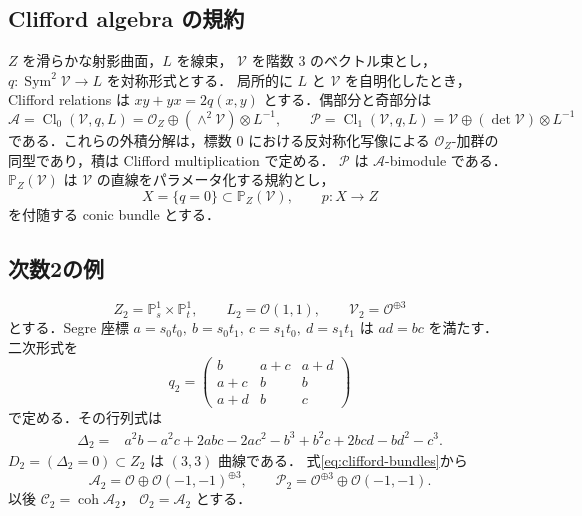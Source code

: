 \subsection{Clifford algebra の規約}

$Z$ を滑らかな射影曲面，$L$ を線束，
$\mathcal V$ を階数 $3$ のベクトル束とし，
$q:\operatorname{Sym}^2\mathcal V\to L$ を対称形式とする．
局所的に $L$ と $\mathcal V$ を自明化したとき，Clifford relations は
$xy+yx=2q(x,y)$ とする．偶部分と奇部分は
\begin{equation}
 \mathcal A=\operatorname{Cl}_0(\mathcal V,q,L)
 =\mathcal O_Z\oplus(\wedge^2\mathcal V)\otimes L^{-1},
 \qquad
 \mathcal P=\operatorname{Cl}_1(\mathcal V,q,L)
 =\mathcal V\oplus(\det\mathcal V)\otimes L^{-1}
 \label{eq:clifford-bundles}
\end{equation}
である．これらの外積分解は，標数 $0$ における反対称化写像による
$\mathcal O_Z$-加群の同型であり，積は Clifford multiplication で定める．
$\mathcal P$ は $\mathcal A$-bimodule である．
$\mathbb P_Z(\mathcal V)$ は $\mathcal V$ の直線をパラメータ化する規約とし，
\[
 X=\{q=0\}\subset\mathbb P_Z(\mathcal V),\qquad p:X\to Z
\]
を付随する conic bundle とする．

\subsection{次数2の例}
\label{subsec:example2}

\[
 Z_2=\mathbb P^1_s\times\mathbb P^1_t,\qquad
 L_2=\mathcal O(1,1),\qquad \mathcal V_2=\mathcal O^{\oplus3}
\]
とする．Segre 座標
$a=s_0t_0,\ b=s_0t_1,\ c=s_1t_0,\ d=s_1t_1$ は $ad=bc$ を満たす．
二次形式を
\begin{equation}
 q_2=
 \begin{pmatrix}
 b&a+c&a+d\\
 a+c&b&b\\
 a+d&b&c
 \end{pmatrix}
 \label{eq:q2}
\end{equation}
で定める．その行列式は
\begin{align}
 \Delta_2={}&a^2b-a^2c+2abc-2ac^2-b^3+b^2c
             +2bcd-bd^2-c^3 .
 \label{eq:discriminant2}
\end{align}
$D_2=(\Delta_2=0)\subset Z_2$ は $(3,3)$ 曲線である．
式\eqref{eq:clifford-bundles}から
\begin{equation}
 \mathcal A_2=\mathcal O\oplus\mathcal O(-1,-1)^{\oplus3},
 \qquad
 \mathcal P_2=\mathcal O^{\oplus3}\oplus\mathcal O(-1,-1).
 \label{eq:bundles2}
\end{equation}
以後 $\mathcal C_2=\operatorname{coh}\mathcal A_2$，
$\mathcal O_2=\mathcal A_2$ とする．

